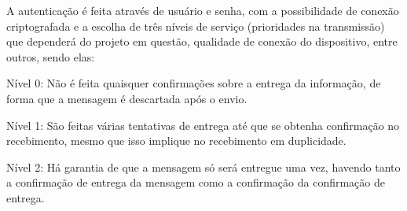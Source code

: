         \begin{figure}[!h]
	    \end{figure}
	    
	    A autenticação é feita através de usuário e senha, com a possibilidade de conexão criptografada e a escolha de três níveis de serviço (prioridades na transmissão) que dependerá do projeto em questão, qualidade de conexão do dispositivo, entre outros, sendo elas: 
	    
        \begin{alineascomponto}
        	\item Nível 0: Não é feita quaisquer confirmações sobre a entrega da informação, de forma que a mensagem é descartada após o envio.
        	\item Nível 1: São feitas várias tentativas de entrega até que se obtenha confirmação no recebimento, mesmo que isso implique no recebimento em duplicidade.
        	\item Nível 2: Há garantia de que a mensagem só será entregue uma vez, havendo tanto a confirmação de entrega da mensagem como a confirmação da confirmação de entrega.
        \end{alineascomponto}
